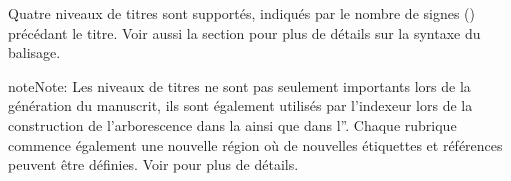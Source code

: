 \documentclass[a4paper,11pt,french]{sphinxmanual}
\begin{document}
\sphinxAtStartPar
Quatre niveaux de titres sont supportés, indiqués par le nombre de signes (\sphinxcode{\sphinxupquote{\#}}) précédant le titre. Voir aussi la section {\hyperref[\detokenize{usage_format:a-fmt}]{}} pour plus de détails sur la syntaxe du balisage.

\begin{sphinxadmonition}{note}{Note:}
\sphinxAtStartPar
Les niveaux de titres ne sont pas seulement importants lors de la génération du manuscrit, ils sont également utilisés par l’indexeur lors de la construction de l’arborescence dans la  ainsi que dans l”. Chaque rubrique commence également une nouvelle région où de nouvelles étiquettes et références peuvent être définies. Voir {\hyperref[\detokenize{project_references:a-references}]{}} pour plus de détails.
\end{sphinxadmonition}
\end{document}
